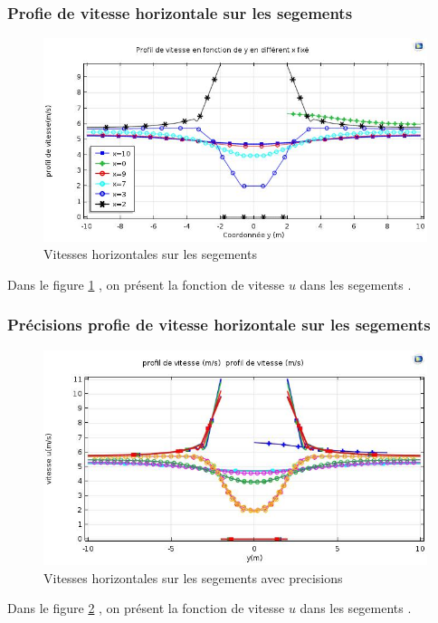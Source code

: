 \documentclass[a4paper,11pt]{report} %
\begin{document}
\subsubsection{Profie de vitesse horizontale sur les segements }
\begin{figure}[!h]
\centering
\hspace*{0mm}\vfill
\begin{center} \includegraphics[width=1.\textwidth]{u_segment.jpg} \end{center}
\vfill\hspace*{0mm}
\caption{Vitesses horizontales sur les segements}
\label{vitesse_u_sege}
\end{figure}\pagebreak
Dans le figure \ref{vitesse_u_sege} , on présent la fonction de vitesse $u$ dans les segements . 


\subsubsection{Précisions profie de vitesse horizontale sur les segements }
\begin{figure}[!h]
\centering
\hspace*{0mm}\vfill
\begin{center} \includegraphics[width=1.\textwidth]{pre_u_segment.jpg} \end{center}
\vfill\hspace*{0mm}
\caption{Vitesses horizontales sur les segements  avec precisions}
\label{vitesse_u_sege_hh}
\end{figure}\pagebreak
Dans le figure \ref{vitesse_u_sege_hh} , on présent la fonction de vitesse $u$ dans les segements . 
\end{document}
